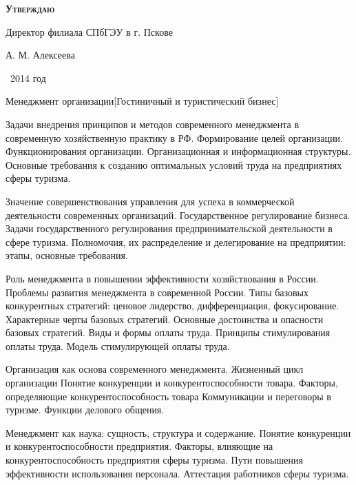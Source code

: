 \documentclass[
	11pt,
	a4paper,
	]
	{article}
\begin{document}
\newlength{\pblength}\settowidth{\pblength}{Директор филиала СПбГЭУ в г. Пскове}

\hfill\parbox{\pblength}{
	\textbf{\textsc{Утверждаю}}\medskip

	Директор филиала СПбГЭУ в г. Пскове\medskip

	\makebox[3cm]{\hrulefill} А. М. Алексеева\medskip

	\makebox[1.5cm]{<<\hrulefill>>} \makebox[3cm]{\hrulefill}\ 2014 год
}


 {Менеджмент организации}[Гостиничный и туристический бизнес]

	

\noindent{} 
	{
		Задачи внедрения принципов и методов современного менеджмента в современную хозяйственную практику в РФ.
	}{
		Формирование целей организации. Функционирования организации. Организационная и информационная структуры.
	}{
		Основные требования к созданию оптимальных условий труда на предприятиях сферы туризма.
	}

\bigskip

\noindent{} 
	{
		Значение совершенствования управления для успеха в коммерческой деятельности современных организаций.
	}{
		Государственное регулирование бизнеса. Задачи государственного регулирования предпринимательской деятельности в сфере туризма.
	}{
		Полномочия, их распределение и делегирование на предприятии: этапы, основные требования.
	}

\bigskip

\noindent{} 
	{
		Роль менеджмента в повышении эффективности хозяйствования в России. Проблемы развития менеджмента в современной России.
	}{
		Типы базовых конкурентных стратегий: ценовое лидерство, дифференциация, фокусирование. Характерные черты базовых стратегий. Основные достоинства и опасности базовых стратегий.
	}{
		Виды и формы оплаты труда. Принципы стимулирования оплаты труда. Модель стимулирующей оплаты труда.
	}

\bigskip

\noindent{} 
	{
		Организация как основа современного менеджмента. Жизненный цикл организации
	}{
		Понятие конкуренции и конкурентоспособности товара. Факторы, определяющие конкурентоспособность товара
	}{
		Коммуникации и переговоры в туризме. Функции делового общения.
	}

\bigskip

\noindent{} 
	{
		Менеджмент как наука: сущность, структура и содержание.
	}{
		Понятие конкуренции и конкурентоспособности предприятия. Факторы, влияющие на конкурентоспособность предприятия сферы туризма.
	}{
		Пути повышения эффективности использования персонала. Аттестация работников сферы туризма.
	}
\end{document}
